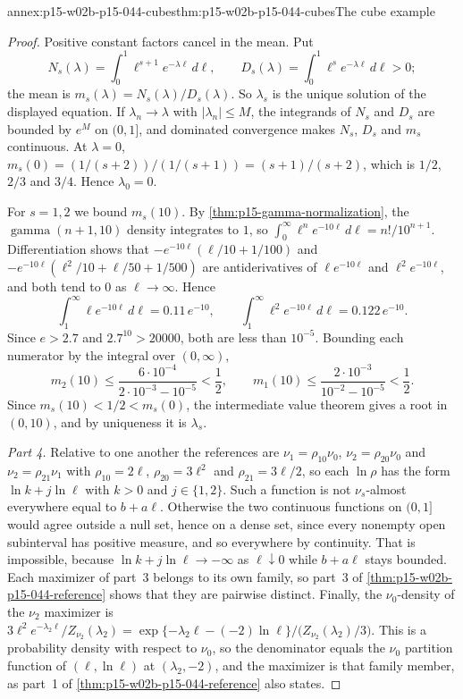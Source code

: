 \begin{annexitem}{annex:p15-w02b-p15-044-cubes}{thm:p15-w02b-p15-044-cubes}{The cube example}
\begin{proof}
Positive constant factors cancel in the mean. Put
\[
 N_s(\lambda)=\int_0^1\ell^{s+1}e^{-\lambda\ell}\,d\ell,\qquad
 D_s(\lambda)=\int_0^1\ell^se^{-\lambda\ell}\,d\ell>0;
\]
the mean is \(m_s(\lambda)=N_s(\lambda)/D_s(\lambda)\). So \(\lambda_s\) is
the unique solution of the displayed equation. If \(\lambda_n\to\lambda\)
with \(|\lambda_n|\leq M\), the integrands of \(N_s\) and \(D_s\) are
bounded by \(e^M\) on \((0,1]\), and dominated convergence makes \(N_s\),
\(D_s\) and \(m_s\) continuous. At \(\lambda=0\),
\(m_s(0)=(1/(s+2))/(1/(s+1))=(s+1)/(s+2)\), which is \(1/2\), \(2/3\) and
\(3/4\). Hence \(\lambda_0=0\).

For \(s=1,2\) we bound \(m_s(10)\). By \cref{thm:p15-gamma-normalization},
the \(\operatorname{gamma}(n+1,10)\) density integrates to \(1\), so
\(\int_0^\infty\ell^ne^{-10\ell}\,d\ell=n!/10^{n+1}\). Differentiation shows
that \(-e^{-10\ell}(\ell/10+1/100)\) and
\(-e^{-10\ell}(\ell^2/10+\ell/50+1/500)\) are antiderivatives of
\(\ell e^{-10\ell}\) and \(\ell^2e^{-10\ell}\), and both tend to \(0\) as
\(\ell\to\infty\). Hence
\[
 \int_1^\infty\ell e^{-10\ell}\,d\ell=0.11\,e^{-10},\qquad
 \int_1^\infty\ell^2e^{-10\ell}\,d\ell=0.122\,e^{-10}.
\]
Since \(e>2.7\) and \(2.7^{10}>20000\), both are less than \(10^{-5}\).
Bounding each numerator by the integral over \((0,\infty)\),
\[
 m_2(10)\leq\frac{6\cdot10^{-4}}{2\cdot10^{-3}-10^{-5}}<\frac12,
 \qquad
 m_1(10)\leq\frac{2\cdot10^{-3}}{10^{-2}-10^{-5}}<\frac12 .
\]
Since \(m_s(10)<1/2<m_s(0)\), the intermediate value theorem gives a root
in \((0,10)\), and by uniqueness it is \(\lambda_s\).

\emph{Part 4.} Relative to one another the references are
\(\nu_1=\rho_{10}\nu_0\), \(\nu_2=\rho_{20}\nu_0\) and
\(\nu_2=\rho_{21}\nu_1\) with \(\rho_{10}=2\ell\), \(\rho_{20}=3\ell^2\)
and \(\rho_{21}=3\ell/2\), so each \(\ln\rho\) has the form
\(\ln k+j\ln\ell\) with \(k>0\) and \(j\in\{1,2\}\). Such a function is not
\(\nu_s\)-almost everywhere equal to \(b+a\ell\). Otherwise the two
continuous functions on \((0,1]\) would agree outside a null set, hence on a
dense set, since every nonempty open subinterval has positive measure, and
so everywhere by continuity. That is impossible, because
\(\ln k+j\ln\ell\to-\infty\) as \(\ell\downarrow0\) while \(b+a\ell\) stays
bounded. Each maximizer of part~3 belongs to its own family, so part~3 of
\cref{thm:p15-w02b-p15-044-reference} shows that they are pairwise distinct.
Finally, the \(\nu_0\)-density of the \(\nu_2\) maximizer is
\(3\ell^2e^{-\lambda_2\ell}/Z_{\nu_2}(\lambda_2)
 =\exp\{-\lambda_2\ell-(-2)\ln\ell\}\big/\bigl(Z_{\nu_2}(\lambda_2)/3\bigr)\).
This is a probability density with respect to \(\nu_0\), so the
denominator equals the \(\nu_0\) partition function of \((\ell,\ln\ell)\) at
\((\lambda_2,-2)\), and the maximizer is that family member, as part~1 of
\cref{thm:p15-w02b-p15-044-reference} also states.


\end{proof}
\end{annexitem}
